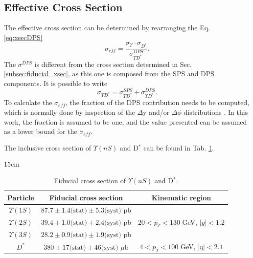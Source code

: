 \subsection{Effective Cross Section}

The effective cross section can be determined by rearranging the Eq. \ref{eq:xsecDPS}
\begin{equation}
  \sigma_{eff} = \frac{\sigma_\Upsilon \cdot \sigma_{D^*}}{\sigma_{\Upsilon D^*}^{DPS}}.
\end{equation}
The $\sigma^{DPS}$ is different from the cross section determined in Sec. \ref{subsec:fiducial_xsec}, as this one is composed from the SPS and DPS components. It is possible to write
\begin{equation}
  \sigma_{\Upsilon D^*} = \sigma_{\Upsilon D^*}^{SPS} + \sigma_{\Upsilon D^*}^{DPS}.
\end{equation}
To calculate the $\sigma_{eff}$, the fraction of the DPS contribution needs to be computed, which is normally done by inspection of the $\Delta$y and/or $\Delta\phi$ distributions \cite{Lansberg:2019adr}. In this work, the fraction is assumed to be one, and the value presented can be assumed as a lower bound for the $\sigma_{eff}$.

The inclusive cross section of $\Upsilon(nS)$ and D$^*$ can be found in Tab. \ref{tab:inclusive_xsec}.

\begin{table}[!htbp]{15cm}
  \caption{Fiducial cross section of $\Upsilon(nS)$ and D$^*$.}
  \begin{tabular}{ c | c | c }
    \hline
    Particle & Fiducial cross section & Kinematic region \\ \hline
    $\Upsilon(1S)$ & $87.7 \pm 1.4 \text{(stat)} \pm 5.3 \text{(syst)}$ pb  & \multirow[c]{3}{*}{$20 < p_T < 130$ GeV, $|y| < 1.2$} \bigstrut\\\cline{1-2}  
    $\Upsilon(2S)$ & $39.4 \pm 1.0 \text{(stat)} \pm 2.4 \text{(syst)}$ pb  &  \bigstrut\\\cline{1-2} 
    $\Upsilon(3S)$ & $28.2 \pm 0.9 \text{(stat)} \pm 1.9 \text{(syst)}$ pb  & \bigstrut\\\cline{1-3} 
    $D^*$          & $380 \pm 17 \text{(stat)} \pm 46 \text{(syst)}$ $\mu$b & $4 < p_T < 100$ GeV, $|\eta| < 2.1$ \\ \hline
  \end{tabular}
  \label{tab:inclusive_xsec}
\end{table}

